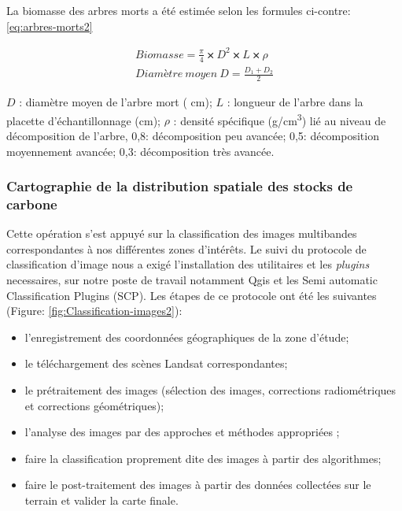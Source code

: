 \documentclass[
  12pt,
  a4paper,
  extrafontsizes,
  onecolumn,
  openright]{book}
\providecommand{\tightlist}{%
  \setlength{\itemsep}{0pt}\setlength{\parskip}{0pt}}
\theoremstyle{definition}
\theoremstyle{definition}
\theoremstyle{definition}
\theoremstyle{definition}
\theoremstyle{remark}
\begin{document}
La biomasse des arbres morts a été estimée selon les formules ci-contre: \eqref{eq:arbres-morts2}

\begin{equation}
\begin{split}
Biomasse=\frac{\pi}{4}⨯D^2⨯L⨯\rho\\
Diamètre\  moyen\ D=\frac{D_1+D_2}{2}
\end{split}
\label{eq:arbres-morts2}
\end{equation}

\(D\) : diamètre moyen de l'arbre mort ( cm);
\(L\) : longueur de l'arbre dans la placette d'échantillonnage (cm);
\(\rho\) : densité spécifique (g/cm\textsuperscript{3}) lié au niveau de décomposition de l'arbre, 0,8: décomposition peu avancée; 0,5: décomposition moyennement avancée; 0,3: décomposition très avancée.

\hypertarget{cartographie-de-la-distribution-spatiale-des-stocks-de-carbone}{%
\subsubsection{Cartographie de la distribution spatiale des stocks de carbone}\label{cartographie-de-la-distribution-spatiale-des-stocks-de-carbone}}

Cette opération s'est appuyé sur la classification des images multibandes correspondantes à nos différentes zones d'intérêts. Le suivi du protocole de classification d'image nous a exigé l'installation des utilitaires et les \emph{plugins} necessaires, sur notre poste de travail notamment Qgis et les Semi automatic Classification Plugins (SCP). Les étapes de ce protocole ont été les suivantes (Figure: \ref{fig:Classification-images2}):

\begin{itemize}
\tightlist
\item
  l'enregistrement des coordonnées géographiques de la zone d'étude;
\item
  le téléchargement des scènes Landsat correspondantes;
\item
  le prétraitement des images (sélection des images, corrections radiométriques et corrections géométriques);
\item
  l'analyse des images par des approches et méthodes appropriées ;
\item
  faire la classification proprement dite des images à partir des algorithmes;
\item
  faire le post-traitement des images à partir des données collectées sur le terrain et valider la carte finale.
\end{itemize}
\end{document}
